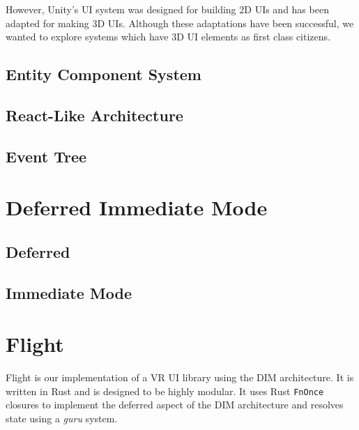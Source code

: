 \documentclass[conference,12pt]{IEEEtran}
\begin{document}
However, Unity's UI system was designed for building 2D UIs and has been adapted
for making 3D UIs. Although these adaptations have been successful, we wanted to
explore systems which have 3D UI elements as first class citizens.

\subsection{Entity Component System}\label{sec:ecs}

\subsection{React-Like Architecture}\label{sec:react}

\subsection{Event Tree}\label{sec:event-tree}

\section{Deferred Immediate Mode}\label{sec:dim}

\subsection{Deferred}

\subsection{Immediate Mode}

\section{Flight}\label{sec:flight}
Flight is our implementation of a VR UI library using the DIM architecture. It
is written in Rust and is designed to be highly modular. It uses Rust
\texttt{FnOnce} closures to implement the deferred aspect of the DIM
architecture and resolves state using a \textit{guru} system.
\end{document}
